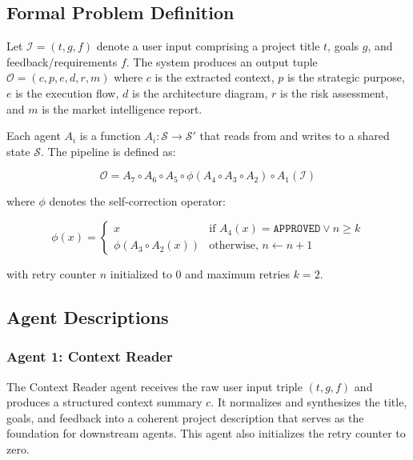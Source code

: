 \documentclass[journal]{IEEEtran}
\begin{document}
\subsection{Formal Problem Definition}

Let $\mathcal{I} = (t, g, f)$ denote a user input comprising a project title $t$, goals $g$, and feedback/requirements $f$. The system produces an output tuple $\mathcal{O} = (c, p, e, d, r, m)$ where $c$ is the extracted context, $p$ is the strategic purpose, $e$ is the execution flow, $d$ is the architecture diagram, $r$ is the risk assessment, and $m$ is the market intelligence report.

Each agent $A_i$ is a function $A_i: \mathcal{S} \rightarrow \mathcal{S}'$ that reads from and writes to a shared state $\mathcal{S}$. The pipeline is defined as:

\begin{equation}
    \mathcal{O} = A_7 \circ A_6 \circ A_5 \circ \phi(A_4 \circ A_3 \circ A_2) \circ A_1(\mathcal{I})
    \label{eq:pipeline}
\end{equation}

where $\phi$ denotes the self-correction operator:

\begin{equation}
    \phi(x) = \begin{cases}
        x & \text{if } A_4(x) = \texttt{APPROVED} \lor n \geq k \\
        \phi(A_3 \circ A_2(x)) & \text{otherwise, } n \leftarrow n+1
    \end{cases}
    \label{eq:selfcorrect}
\end{equation}

with retry counter $n$ initialized to 0 and maximum retries $k=2$.

\subsection{Agent Descriptions}

\subsubsection{Agent 1: Context Reader}
The Context Reader agent receives the raw user input triple $(t, g, f)$ and produces a structured context summary $c$. It normalizes and synthesizes the title, goals, and feedback into a coherent project description that serves as the foundation for downstream agents. This agent also initializes the retry counter to zero.
\end{document}
